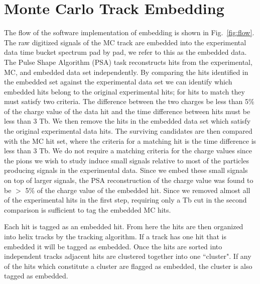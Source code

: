 

\section{Monte Carlo Track Embedding}

The flow of the software implementation of embedding is shown in Fig.~\ref{fig:flow}. The raw digitized signals of the MC track are embedded into the experimental data time bucket spectrum pad by pad, we refer to this as the embedded data. The Pulse Shape Algorithm (PSA) task reconstructs hits from the experimental, MC, and embedded data set independently. By comparing the hits identified in the embedded set against the experimental data set we can identify which embedded hits belong to the original experimental hits; for hits to match they must satisfy two criteria. The difference between the two charges be less than 5\% of the charge value of the data hit and the time difference between hits must be less than 3 Tb. We then remove the hits in the embedded data set which satisfy the original experimental data hits. The surviving candidates are then compared with the MC hit set, where the criteria for a matching hit is the time difference is less than 3 Tb. We do not require a matching criteria for the charge values since the pions we wish to study induce small signals relative to most of the particles producing signals in the experimental data. Since we embed these small signals on top of larger signals, the PSA reconstruction of the charge value was found to be $>$ 5\% of the charge value of the embedded hit. Since we removed almost all of the experimental hits in the first step, requiring only a Tb cut in the second comparison is sufficient to tag the embedded MC hits. 

Each hit is tagged as an embedded hit. From here the hits are then organized into helix tracks by the tracking algorithm. If a track has one hit that is embedded it will be tagged as embedded. Once the hits are sorted into independent tracks adjacent hits are clustered together into one ``cluster". If any of the hits which constitute a cluster are flagged as embedded, the cluster is also tagged as embedded. 

